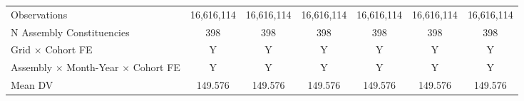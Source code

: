 \begin{tabular}{lcccccc}
\hline
Observations&  16,616,114         &  16,616,114         &  16,616,114         &  16,616,114         &  16,616,114         &  16,616,114         \\
N Assembly Constituencies&         398         &         398         &         398         &         398         &         398         &         398         \\
Grid $\times$ Cohort FE&           Y         &           Y         &           Y         &           Y         &           Y         &           Y         \\
Assembly $\times$ Month-Year $\times$ Cohort FE&           Y         &           Y         &           Y         &           Y         &           Y         &           Y         \\
Mean DV     &     149.576         &     149.576         &     149.576         &     149.576         &     149.576         &     149.576         \\
\hline
\end{tabular}
